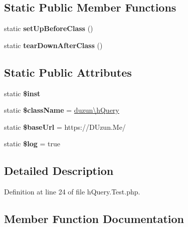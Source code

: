 \subsection*{Static Public Member Functions}
\begin{DoxyCompactItemize}
\item 
\mbox{\label{classTestHQuery_a4f5b545478318e25b46125531f56d26d}} 
static {\bfseries set\+Up\+Before\+Class} ()
\item 
\mbox{\label{classTestHQuery_a8b72b793043899d0810ed7ae78572b09}} 
static {\bfseries tear\+Down\+After\+Class} ()
\end{DoxyCompactItemize}
\subsection*{Static Public Attributes}
\begin{DoxyCompactItemize}
\item 
\mbox{\label{classTestHQuery_ad40a9a371113a5fce1aac4dcfc3c1ed5}} 
static {\bfseries \$inst}
\item 
\mbox{\label{classTestHQuery_ae2d54209b1b8f4dfcb6aa57c3a0e1a39}} 
static {\bfseries \$class\+Name} = \textquotesingle{}\mbox{\hyperlink{classduzun_1_1hQuery}{duzun\textbackslash{}h\+Query}}\textquotesingle{}
\item 
\mbox{\label{classTestHQuery_ab73cf4c97b0c5bb36c6d598ddb207abc}} 
static {\bfseries \$base\+Url} = \textquotesingle{}https\+://D\+Uzun.\+Me/\textquotesingle{}
\item 
\mbox{\label{classTestHQuery_aafd4fb37eb7f22ecdc486f38d3a8205f}} 
static {\bfseries \$log} = true
\end{DoxyCompactItemize}


\subsection{Detailed Description}


Definition at line 24 of file h\+Query.\+Test.\+php.



\subsection{Member Function Documentation}
\mbox{\label{classTestHQuery_a88d84974baeb7a51f57df60c1e278013}} 
